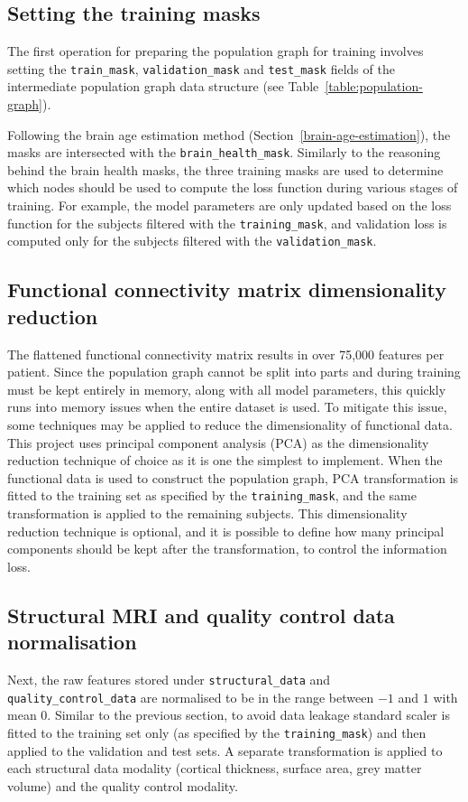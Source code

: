 \subsection{Setting the training masks}
The first operation for preparing the population graph for training involves setting the \texttt{train\_mask}, \texttt{validation\_mask} and \texttt{test\_mask} fields of the intermediate population graph data structure (see Table~\ref{table:population-graph}). 

Following the brain age estimation method (Section~\ref{brain-age-estimation}), the masks are intersected with the \texttt{brain\_health\_mask}. Similarly to the reasoning behind the brain health masks, the three training masks are used to determine which nodes should be used to compute the loss function during various stages of training. For example, the model parameters are only updated based on the loss function for the subjects filtered with the \texttt{training\_mask}, and validation loss is computed only for the subjects filtered with the \texttt{validation\_mask}.

\subsection{Functional connectivity matrix dimensionality reduction}
The flattened functional connectivity matrix results in over 75,000 features per patient. Since the population graph cannot be split into parts and during training must be kept entirely in memory, along with all model parameters, this quickly runs into memory issues when the entire dataset is used. To mitigate this issue, some techniques may be applied to reduce the dimensionality of functional data. This project uses principal component analysis (PCA) as the dimensionality reduction technique of choice as it is one the simplest to implement. When the functional data is used to construct the population graph, PCA transformation is fitted to the training set as specified by the \texttt{training\_mask}, and the same transformation is applied to the remaining subjects. This dimensionality reduction technique is optional, and it is possible to define how many principal components should be kept after the transformation, to control the information loss.

\subsection{Structural MRI and quality control data normalisation}
Next, the raw features stored under \texttt{structural\_data} and \texttt{quality\_control\_data} are normalised to be in the range between $-1$ and $1$ with mean 0. Similar to the previous section, to avoid data leakage standard scaler is fitted to the training set only (as specified by the \texttt{training\_mask}) and then applied to the validation and test sets. A separate transformation is applied to each structural data modality (cortical thickness, surface area, grey matter volume) and the quality control modality.

